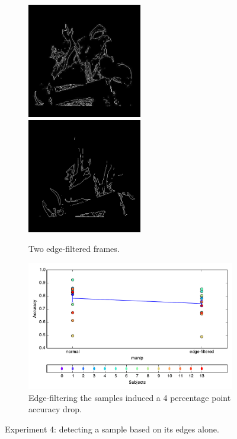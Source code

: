 \begin{figure}[htb]
\centering
\begin{subfigure}[b]{\textwidth}
\centering
                \includegraphics[width=5cm]{img/edges.png}\hspace{0.5cm}\includegraphics[width=5cm]{img/edges2.png}
                \caption{Two edge-filtered frames.}
         
        \end{subfigure}
\begin{subfigure}[b]{\textwidth}
\centering
                \includegraphics[width=12cm]{img/fig_fire10-edges_correct_manip.pdf}
                \caption{Edge-filtering the samples induced a 4 percentage point accuracy drop.}
      		\label{f:e2:learn}
        \end{subfigure}
\caption{Experiment 4: detecting a sample based on its edges alone.}
\end{figure}

